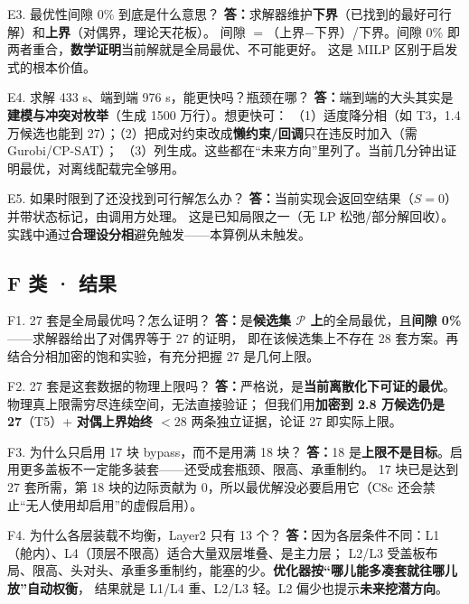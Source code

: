 \documentclass[11pt]{ctexart}
\newcommand{\setP}{\mathcal{P}}
\newcommand{\A}{\textbf{答：}}
\begin{document}
\begin{qa}{E3. 最优性间隙 0\% 到底是什么意思？}
\A 求解器维护\textbf{下界}（已找到的最好可行解）和\textbf{上界}（对偶界，理论天花板）。
间隙 $=$（上界$-$下界）/下界。间隙 0\% 即两者重合，\textbf{数学证明}当前解就是全局最优、不可能更好。
这是 MILP 区别于启发式的根本价值。
\end{qa}

\begin{qa}{E4. 求解 433 s、端到端 976 s，能更快吗？瓶颈在哪？}
\A 端到端的大头其实是\textbf{建模与冲突对枚举}（生成 1500 万行）。想更快可：
（1）适度降分相（如 T3，1.4 万候选也能到 27）；（2）把成对约束改成\textbf{懒约束/回调}只在违反时加入（需 Gurobi/CP-SAT）；
（3）列生成。这些都在“未来方向”里列了。当前几分钟出证明最优，对离线配载完全够用。
\end{qa}

\begin{qa}{E5. 如果时限到了还没找到可行解怎么办？}
\A 当前实现会返回空结果（$S=0$）并带状态标记，由调用方处理。
这是已知局限之一（无 LP 松弛/部分解回收）。实践中通过\textbf{合理设分相}避免触发——本算例从未触发。
\end{qa}

\subsection{F 类 · 结果}

\begin{qa}{F1. 27 套是全局最优吗？怎么证明？}
\A 是\textbf{候选集 $\setP$ 上}的全局最优，且\textbf{间隙 0\%}——求解器给出了对偶界等于 27 的证明，
即在该候选集上不存在 28 套方案。再结合分相加密的饱和实验，有充分把握 27 是几何上限。
\end{qa}

\begin{qa}{F2. 27 套是这套数据的物理上限吗？}
\A 严格说，是\textbf{当前离散化下可证的最优}。物理真上限需穷尽连续空间，无法直接验证；
但我们用\textbf{加密到 2.8 万候选仍是 27}（T5）+ \textbf{对偶上界始终 $<28$} 两条独立证据，论证 27 即实际上限。
\end{qa}

\begin{qa}{F3. 为什么只启用 17 块 bypass，而不是用满 18 块？}
\A 18 是\textbf{上限不是目标}。启用更多盖板不一定能多装套——还受成套瓶颈、限高、承重制约。
17 块已是达到 27 套所需，第 18 块的边际贡献为 0，所以最优解没必要启用它（C8c 还会禁止“无人使用却启用”的虚假启用）。
\end{qa}

\begin{qa}{F4. 为什么各层装载不均衡，Layer2 只有 13 个？}
\A 因为各层条件不同：L1（舱内）、L4（顶层不限高）适合大量双层堆叠、是主力层；
L2/L3 受盖板布局、限高、头对头、承重多重制约，能塞的少。\textbf{优化器按“哪儿能多凑套就往哪儿放”自动权衡}，
结果就是 L1/L4 重、L2/L3 轻。L2 偏少也提示\textbf{未来挖潜方向}。
\end{qa}
\end{document}
